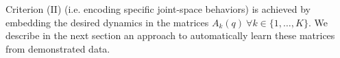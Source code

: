 \documentclass[letterpaper, 10 pt, conference,fleqn]{ieeeconf}
\begin{document}

Criterion (II) (i.e. encoding specific joint-space behaviors) is achieved by embedding the desired dynamics in the matrices $A_k(q)~ \forall k \in\{1,\dots,K\}$. We describe in the next section an approach to automatically learn these matrices from demonstrated data. 



\end{document}
